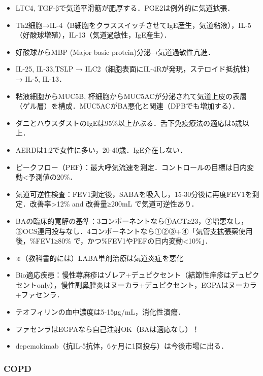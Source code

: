 \begin{itemize}
\item LTC4, TGF-βで気道平滑筋が肥厚する．PGE2は例外的に気道拡張．
\item Th2細胞→IL-4（B細胞をクラススイッチさせてIgE産生，気道粘液），IL-5（好酸球増殖），IL-13（気道過敏性，IgE産生）． 
\item 好酸球からMBP (Major basic protein)分泌→気道過敏性亢進．
\item IL-25, IL-33,TSLP → ILC2（細胞表面にIL-4Rが発現，ステロイド抵抗性） → IL-5, IL-13．
\item 粘液細胞からMUC5B, 杯細胞からMUC5ACが分泌されて気道上皮の表層（ゲル層）を構成．MUC5ACがBA悪化と関連（DPBでも増加する）．
\item ダニとハウスダストのIgEは95\%以上かぶる．舌下免疫療法の適応は5歳以上．
\item AERDは1:2で女性に多い，20-40歳．IgE介在しない．
\item ピークフロー（PEF）：最大呼気流速を測定．コントロールの目標は日内変動<予測値の20\%．
\item 気道可逆性検査：FEV1測定後，SABAを吸入し，15-30分後に再度FEV1を測定．改善率>12\% and 改善量≥200mL で気道可逆性あり．
\item BAの臨床的寛解の基準：3コンポーネントなら①ACT≥23，②増悪なし，③OCS連用投与なし．4コンポーネントなら①②③+④「気管支拡張薬使用後，\%FEV1≥80\% で，かつ\%FEV1やPEFの日内変動<10\%」．
\item ※（教科書的には）LABA単剤治療は気道炎症を悪化
\item Bio適応疾患：慢性蕁麻疹はゾレア+デュピクセント（結節性痒疹はデュピクセントonly），慢性副鼻腔炎はヌーカラ+デュピクセント，EGPAはヌーカラ+ファセンラ．
\item テオフィリンの血中濃度は5-15μg/mL，消化性潰瘍．
\item ファセンラはEGPAなら自己注射OK（BAは適応なし）！
\item depemokimab（抗IL-5抗体，6ヶ月に1回投与）は今後市場に出る．

\end{itemize}

\subsubsection{COPD}

